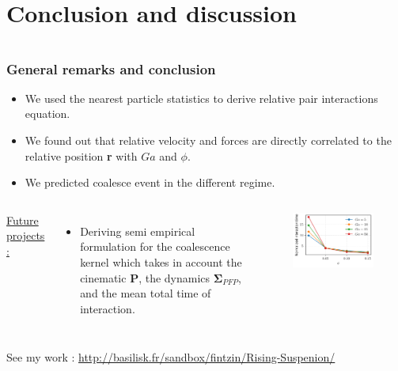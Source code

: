 \documentclass{sintefbeamer}
\begin{document}
\section{Conclusion and discussion}
\section*{}
\begin{frame}
  \frametitle{General remarks and conclusion}

  \begin{itemize}
    \item We used the nearest particle statistics to derive relative pair interactions equation. 
    \item We found out that relative velocity and forces are directly correlated to the relative position \textbf{r} with $Ga$ and $\phi$. 
    \item We predicted coalesce event in the different regime. 
  \end{itemize}
  \begin{columns}
    \underline{Future projects : }  
    
    \begin{itemize}
      \item Deriving semi empirical formulation for the coalescence kernel which takes in account the cinematic \textbf{P}, the dynamics $\mathbf{\Sigma}_{PFP}$, and the mean total time of interaction. 
    \end{itemize}
    \begin{figure}
      \includegraphics[width=\textwidth]{image/HOMOGENEOUS/fPA/age.pdf}
    \end{figure}
  \end{columns}
    
See my work : \url{http://basilisk.fr/sandbox/fintzin/Rising-Suspenion/}

\end{frame}
\end{document}
